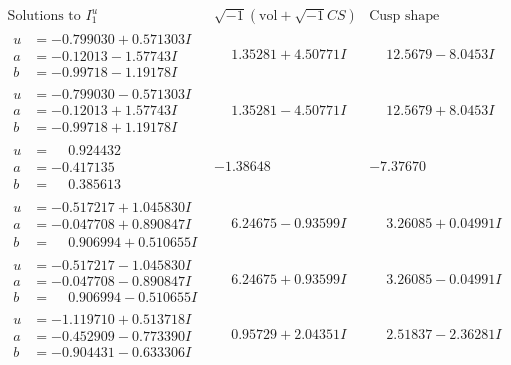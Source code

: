 \documentclass[1p]{elsarticle_modified}
\theoremstyle{definition}
\newcommand{\I}{\sqrt{-1}}
\begin{document}
$$\begin{array}{c|c|c}  
\text{Solutions to }I^u_{1}& \I (\text{vol} + \sqrt{-1}CS) & \text{Cusp shape}\\
 \hline 
\begin{aligned}
u &= -0.799030 + 0.571303 I \\
a &= -0.12013 - 1.57743 I \\
b &= -0.99718 - 1.19178 I\end{aligned}
 & \phantom{-}1.35281 + 4.50771 I & \phantom{-}12.5679 - 8.0453 I \\ \hline\begin{aligned}
u &= -0.799030 - 0.571303 I \\
a &= -0.12013 + 1.57743 I \\
b &= -0.99718 + 1.19178 I\end{aligned}
 & \phantom{-}1.35281 - 4.50771 I & \phantom{-}12.5679 + 8.0453 I \\ \hline\begin{aligned}
u &= \phantom{-}0.924432\phantom{ +0.000000I} \\
a &= -0.417135\phantom{ +0.000000I} \\
b &= \phantom{-}0.385613\phantom{ +0.000000I}\end{aligned}
 & -1.38648\phantom{ +0.000000I} & -7.37670\phantom{ +0.000000I} \\ \hline\begin{aligned}
u &= -0.517217 + 1.045830 I \\
a &= -0.047708 + 0.890847 I \\
b &= \phantom{-}0.906994 + 0.510655 I\end{aligned}
 & \phantom{-}6.24675 - 0.93599 I & \phantom{-}3.26085 + 0.04991 I \\ \hline\begin{aligned}
u &= -0.517217 - 1.045830 I \\
a &= -0.047708 - 0.890847 I \\
b &= \phantom{-}0.906994 - 0.510655 I\end{aligned}
 & \phantom{-}6.24675 + 0.93599 I & \phantom{-}3.26085 - 0.04991 I \\ \hline\begin{aligned}
u &= -1.119710 + 0.513718 I \\
a &= -0.452909 - 0.773390 I \\
b &= -0.904431 - 0.633306 I\end{aligned}
 & \phantom{-}0.95729 + 2.04351 I & \phantom{-}2.51837 - 2.36281 I \\ \hline\begin{aligned}

\end{aligned}
\end{array}$$
\end{document}
